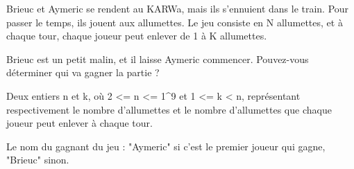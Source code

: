 \problemname{\problemyamlname}

Brieuc et Aymeric se rendent au KARWa, mais ils s'ennuient dans le train. Pour passer le temps, ils jouent aux allumettes. Le jeu consiste en N allumettes,
et à chaque tour, chaque joueur peut enlever de 1 à K allumettes.

Brieuc est un petit malin, et il laisse Aymeric commencer. Pouvez-vous déterminer qui va gagner la partie ?

\begin{Input}
    Deux entiers n et k, où 2 <= n <= 1^9 et 1 <= k < n, représentant respectivement le nombre d'allumettes et le nombre d'allumettes que chaque joueur peut enlever à chaque tour.
\end{Input}

\begin{Output}
    Le nom du gagnant du jeu : "Aymeric" si c'est le premier joueur qui gagne, "Brieuc" sinon.
\end{Output}
